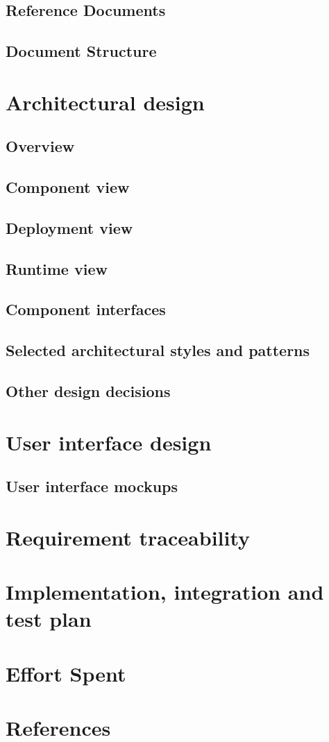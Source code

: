     \section{Reference Documents}
        
    \section{Document Structure}
    	
    
\newpage
\chapter{Architectural design}
    \section{Overview}
    	
    \section{Component view} \label{sec:components}
    	
    \section{Deployment view}
    	
    \section{Runtime view}
    	
    \section{Component interfaces}
    \section{Selected architectural styles and patterns}
    	
    \section{Other design decisions}
\newpage
\chapter{User interface design}
	\section{User interface mockups}
		
\newpage
\chapter{Requirement traceability}
	
\chapter{Implementation, integration and test plan}
\chapter{Effort Spent}
    
\chapter{References}


